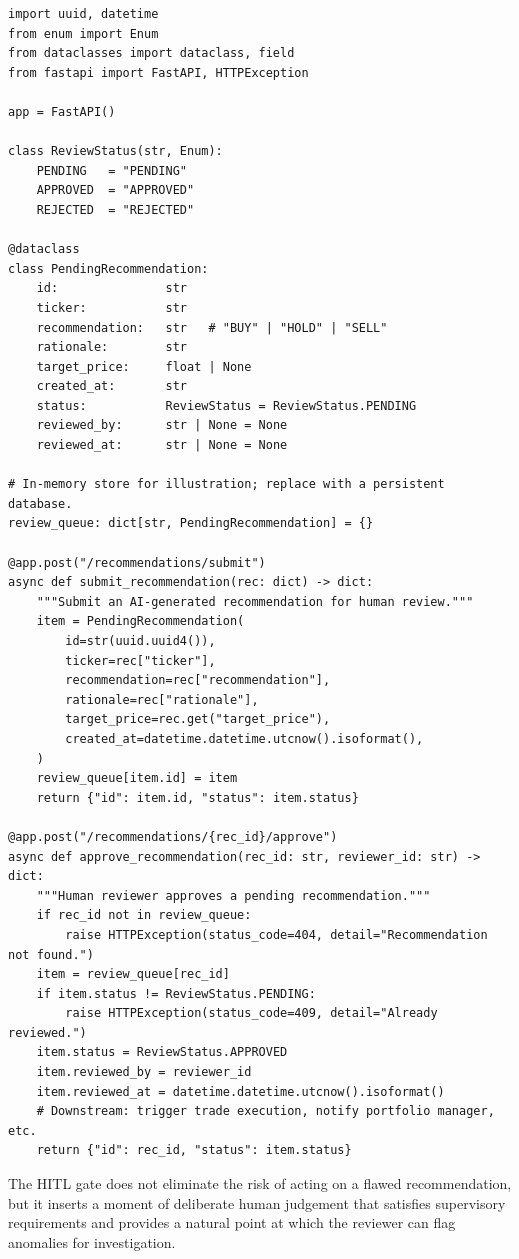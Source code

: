 \begin{verbatim}
import uuid, datetime
from enum import Enum
from dataclasses import dataclass, field
from fastapi import FastAPI, HTTPException

app = FastAPI()

class ReviewStatus(str, Enum):
    PENDING   = "PENDING"
    APPROVED  = "APPROVED"
    REJECTED  = "REJECTED"

@dataclass
class PendingRecommendation:
    id:               str
    ticker:           str
    recommendation:   str   # "BUY" | "HOLD" | "SELL"
    rationale:        str
    target_price:     float | None
    created_at:       str
    status:           ReviewStatus = ReviewStatus.PENDING
    reviewed_by:      str | None = None
    reviewed_at:      str | None = None

# In-memory store for illustration; replace with a persistent database.
review_queue: dict[str, PendingRecommendation] = {}

@app.post("/recommendations/submit")
async def submit_recommendation(rec: dict) -> dict:
    """Submit an AI-generated recommendation for human review."""
    item = PendingRecommendation(
        id=str(uuid.uuid4()),
        ticker=rec["ticker"],
        recommendation=rec["recommendation"],
        rationale=rec["rationale"],
        target_price=rec.get("target_price"),
        created_at=datetime.datetime.utcnow().isoformat(),
    )
    review_queue[item.id] = item
    return {"id": item.id, "status": item.status}

@app.post("/recommendations/{rec_id}/approve")
async def approve_recommendation(rec_id: str, reviewer_id: str) -> dict:
    """Human reviewer approves a pending recommendation."""
    if rec_id not in review_queue:
        raise HTTPException(status_code=404, detail="Recommendation not found.")
    item = review_queue[rec_id]
    if item.status != ReviewStatus.PENDING:
        raise HTTPException(status_code=409, detail="Already reviewed.")
    item.status = ReviewStatus.APPROVED
    item.reviewed_by = reviewer_id
    item.reviewed_at = datetime.datetime.utcnow().isoformat()
    # Downstream: trigger trade execution, notify portfolio manager, etc.
    return {"id": rec_id, "status": item.status}
\end{verbatim}

The HITL gate does not eliminate the risk of acting on a flawed recommendation, but it
inserts a moment of deliberate human judgement that satisfies supervisory requirements
and provides a natural point at which the reviewer can flag anomalies for
investigation.

